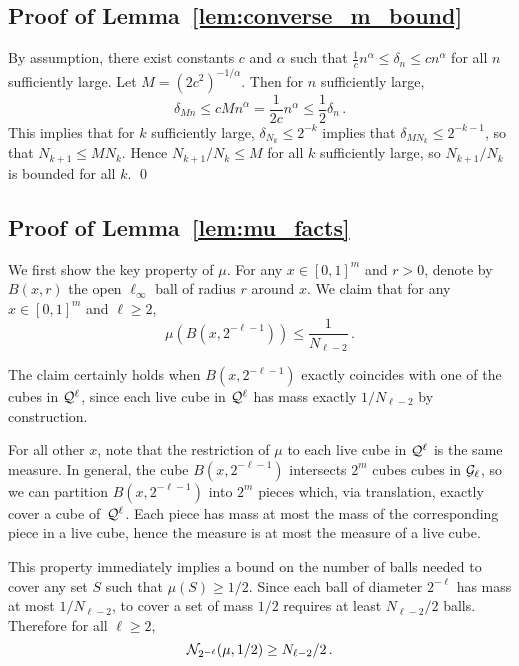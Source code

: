 \subsection{Proof of Lemma~\ref{lem:converse_m_bound}}
By assumption, there exist constants $c$ and $\alpha$ such that $\frac 1 c n^{\alpha} \leq \delta_n \leq c n^{\alpha}$ for all $n$ sufficiently large.
Let $M = (2 c^2)^{-1/\alpha}$.
Then for $n$ sufficiently large, 
\begin{equation*}
\delta_{M n} \leq c {M n}^{\alpha} = \frac{1}{2c} n^{\alpha} \leq \frac 1 2 \delta_n\,.
\end{equation*}
This implies that for $k$ sufficiently large, $\delta_{N_k} \leq 2^{-k}$ implies that $\delta_{M N_k} \leq 2^{-k-1}$, so that $N_{k+1} \leq M N_k$.
Hence $N_{k+1}/N_k \leq M$ for all $k$ sufficiently large, so $N_{k+1}/N_k$ is bounded for all $k$.
\qed

\subsection{Proof of Lemma~\ref{lem:mu_facts}}
We first show the key property of $\mu$.
For any $x \in [0, 1]^m$ and $r > 0$, denote by $B(x, r)$ the open $\ell_\infty$ ball of radius $r$ around $x$.
We claim that for any $x \in [0, 1]^m$ and $\ell \geq 2$,
\begin{equation*}
\mu(B(x, 2^{-\ell-1})) \leq \frac{1}{N_{\ell-2}}\,.
\end{equation*}

The claim certainly holds when $B(x, 2^{-\ell-1})$ exactly coincides with one of the cubes in $\mathcal{Q}^\ell$, since each live cube in $\mathcal{Q}^\ell$ has mass exactly $1/N_{\ell-2}$ by construction.

For all other $x$, note that the restriction of $\mu$ to each live cube in $\mathcal{Q}^\ell$ is the same measure. In general, the cube $B(x, 2^{-\ell-1})$ intersects $2^m$ cubes cubes in $\mathcal{G}_\ell$, so we can partition $B(x, 2^{-\ell-1})$ into $2^m$ pieces which, via translation, exactly cover a cube of~$\mathcal{Q}^\ell$. Each piece has mass at most the mass of the corresponding piece in a live cube, hence the measure is at most the measure of a live cube.

This property immediately implies a bound on the number of balls needed to cover any set $S$ such that $\mu(S) \geq 1/2$.
Since each ball of diameter $2^{-\ell}$ has mass at most $1/N_{\ell-2}$, to cover a set of mass $1/2$ requires at least $N_{\ell-2}/2$ balls.
Therefore for all  $\ell \geq 2$,
\begin{equation}\label{eqn:ball_bound}
\mathcal{N}_{2^{-\ell}}(\mu, 1/2) \geq N_{\ell-2}/2\,.
\end{equation}

